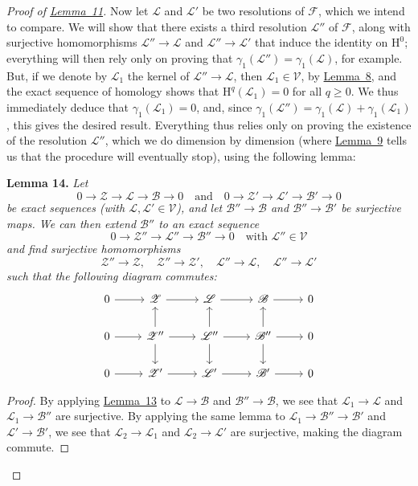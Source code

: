\documentclass{article}
\newenvironment{itenv}[1]
  {\phantomsection\par\medskip\noindent\textbf{#1.}\itshape}
  {\par\medskip}
\newcommand{\scr}[1]{{\mathscr{#1}}}
\renewcommand{\cal}[1]{{\mathcal{#1}}}
\newcommand{\HH}{\mathrm{H}}
\renewcommand{\geq}{\geqslant}
\newcommand{\oldpage}[1]{\marginpar{\footnotesize$\Big\vert$ \textit{p.~#1}}}
\begin{document}
\begin{proof}[Proof of {\hyperref[lemma11]{Lemma~11}}]
  Now let $\scr{L}$ and $\scr{L}'$ be two resolutions of $\scr{F}$, which we intend to compare.
  We will show that there exists a third resolution $\scr{L}''$ of $\scr{F}$, along with surjective homomorphisms $\scr{L}''\to\scr{L}$ and $\scr{L}''\to\scr{L}'$ that induce the identity on $\HH^0$;
  everything will then rely only on proving that $\gamma_1(\scr{L}'')=\gamma_1(\scr{L})$, for example.
  But, if we denote by $\scr{L}_1$ the kernel of $\scr{L}''\to\scr{L}$, then $\scr{L}_1\in\cal{V}$, by \hyperref[lemma8]{Lemma~8}, and the exact sequence of homology shows that $\HH^q(\scr{L}_1)=0$ for all $q\geq0$.
  We thus immediately deduce that $\gamma_1(\scr{L}_1)=0$, and, since $\gamma_1(\scr{L}'')=\gamma_1(\scr{L})+\gamma_1(\scr{L}_1)$, this gives the desired result.
  Everything thus relies only on proving the existence of the resolution $\scr{L}''$, which we do dimension by dimension (where \hyperref[lemma9]{Lemma~9} tells us that the procedure will eventually stop), using the following lemma:
  \begin{itenv}{Lemma 14}
  \label{lemma14}
    Let
    \[
      0\to\scr{Z}\to\scr{L}\to\scr{B}\to0
      \quad\text{and}\quad
      0\to\scr{Z}'\to\scr{L}'\to\scr{B}'\to0
    \]
    be exact sequences (with $\scr{L},\scr{L}'\in\cal{V}$), and let $\scr{B}''\to\scr{B}$ and $\scr{B}''\to\scr{B}'$ be surjective maps.
    We can then extend $\scr{B}''$ to an exact sequence
    \[
      0\to\scr{Z}''\to\scr{L}''\to\scr{B}''\to0
      \quad
      \mbox{with $\scr{L}''\in\cal{V}$}
    \]
    and find surjective homomorphisms
    \[
      \scr{Z}''\to\scr{Z},
      \quad
      \scr{Z}''\to\scr{Z}',
      \quad
      \scr{L}''\to\scr{L},
      \quad
      \scr{L}''\to\scr{L}'
    \]
    such that the following diagram commutes:
    \[
      \begin{tikzcd}
        0 \rar
        & \scr{Z} \rar
        & \scr{L} \rar
        & \scr{B} \rar
        & 0
      \\0 \rar
        & \scr{Z}'' \rar \uar \dar
        & \scr{L}'' \rar \uar \dar
        & \scr{B}'' \rar \uar \dar
        & 0
      \\0 \rar
        & \scr{Z}' \rar
        & \scr{L}' \rar
        & \scr{B}' \rar
        & 0
      \end{tikzcd}
    \]
  \end{itenv}
  \begin{proof}
\oldpage{108}
    By applying \hyperref[lemma13]{Lemma~13} to $\scr{L}\to\scr{B}$ and $\scr{B}''\to\scr{B}$, we see that $\scr{L}_1\to\scr{L}$ and $\scr{L}_1\to\scr{B}''$ are surjective.
    By applying the same lemma to $\scr{L}_1\to\scr{B}''\to\scr{B}'$ and $\scr{L}'\to\scr{B}'$, we see that $\scr{L}_2\to\scr{L}_1$ and $\scr{L}_2\to\scr{L}'$ are surjective, making the diagram commute.


\end{proof}
\end{proof}
\end{document}
